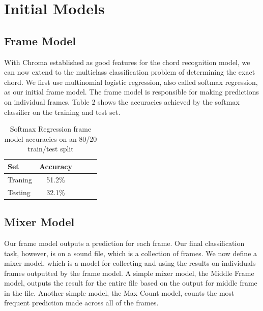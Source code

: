 \documentclass{article}
\begin{document}
\section{Initial Models}
\subsection{Frame Model}
With Chroma established as good features for the chord recognition model, we can now extend to the multiclass classification problem of determining the exact chord. We first use multinomial logistic regression, also called softmax regression, as our initial frame model. The frame model is responsible for making predictions on individual frames. Table 2 shows the accuracies achieved by the softmax classifier on the training and test set.
\begin{table}[t]
\caption{Softmax Regression frame model accuracies on an 80/20 train/test split}
\label{mfccvschroma}
\vskip 0.15in
\begin{center}
\begin{small}
\begin{sc}
\begin{tabular}{lcccr}
\hline
\abovespace\belowspace
Set & Accuracy \\
\hline
\abovespace
Traning    & 51.2\%\\
Testing & 32.1\%\\
\hline
\end{tabular}
\end{sc}
\end{small}
\end{center}
\vskip -0.1in
\end{table}

\subsection{Mixer Model}
Our frame model outputs a prediction for each frame. Our final classification task, however, is on a sound file, which is a collection of frames. We now define a mixer model, which is a model for collecting and using the results on individuals frames outputted by the frame model. A simple mixer model, the Middle Frame model, outputs the result for the entire file based on the output for middle frame in the file. Another simple model, the Max Count model, counts the most frequent prediction made across all of the frames.
\end{document}
